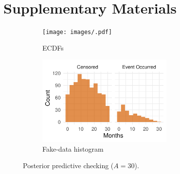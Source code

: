 \pagebreak
\section*{Supplementary Materials}
\begin{figure}[H]
\centering
\begin{subfigure}[t]{0.64\textwidth}
  \centering
  \texttt{[image: images/.pdf]}  %
  \caption{{\small ECDFs}}
  \label{fig:ecdf-event_a30}
\end{subfigure}
\begin{subfigure}[t]{0.351\textwidth}
\centering
\includegraphics[height=4.5cm,width=\linewidth]{images/fake_duration_hist_a30.pdf}   %
\caption{{\small Fake-data histogram}}
\label{fig:fake-hist_a30}
\end{subfigure}
\caption{{\small Posterior predictive checking ($A=30$).}}
\label{fig:ppc-A30}
\end{figure}
